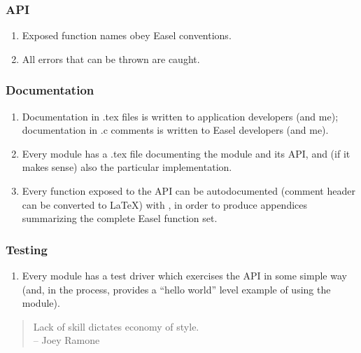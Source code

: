 \subsubsection{API}

\begin{enumerate}
\item Exposed function names obey Easel conventions.

\item All errors that can be thrown are caught.
\end{enumerate}


\subsubsection{Documentation}

\begin{enumerate}
\item Documentation in .tex files is written to application developers
      (and me); documentation in .c comments is written to Easel
      developers (and me).

\item Every module has a .tex file documenting the module and its API,
      and (if it makes sense) also the particular implementation.

\item Every function exposed to the API can be autodocumented (comment
      header can be converted to \LaTeX) with
      , in order to produce appendices
      summarizing the complete Easel function set.
\end{enumerate}


\subsubsection{Testing}

\begin{enumerate}

\item Every module has a test driver which exercises the API in some
      simple way (and, in the process, provides a ``hello world''
      level example of using the module).

\end{enumerate}

\begin{quote}
Lack of skill dictates economy of style.\\
 -- Joey Ramone
\end{quote}     





